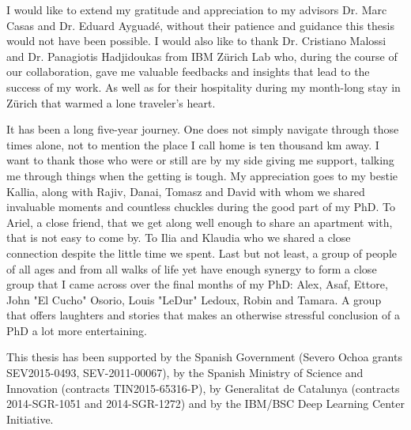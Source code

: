 
\begin{acknowledgements}
	I would like to extend my gratitude and appreciation to my advisors Dr. Marc
	Casas and Dr. Eduard Ayguad\'{e}, without their patience and guidance this
	thesis would not have been possible. I would also like to thank Dr.
	Cristiano Malossi and Dr. Panagiotis Hadjidoukas from IBM Z\"{u}rich Lab
	who, during the course of our collaboration, gave me valuable feedbacks and
	insights that lead to the success of my work. As well as for their
	hospitality during my month-long stay in Z\"{u}rich that warmed a lone
	traveler's heart.

    It has been a long five-year journey. One does not simply navigate through
    those times alone, not to mention the place I call home is ten thousand km
    away. I want to thank those who were or still are by my side giving me
    support, talking me through things when the getting is tough. My
    appreciation goes to my bestie Kallia, along with Rajiv, Danai, Tomasz and
    David with whom we shared invaluable moments and countless chuckles during 
    the good part of my PhD. To Ariel, a close friend, that we get along well 
    enough to share an apartment with, that is not easy to come by. To Ilia and 
    Klaudia who we shared a close connection despite the little time we spent. 
    Last but not least, a group of people of all ages and from all walks of life 
    yet have enough synergy to form a close group that I came across over the 
    final months of my PhD: Alex, Asaf, Ettore, John "El Cucho" Osorio, Louis 
    "LeDur" Ledoux, Robin and Tamara. A group that offers laughters and stories 
    that makes an otherwise stressful conclusion of a PhD a lot more entertaining.	

	This thesis has been supported by the Spanish Government (Severo Ochoa grants
	SEV2015-0493, SEV-2011-00067), by the Spanish Ministry of Science and
	Innovation (contracts TIN2015-65316-P), by Generalitat de Catalunya
	(contracts 2014-SGR-1051 and 2014-SGR-1272) and by the IBM/BSC Deep Learning 
    Center Initiative.
\end{acknowledgements}
